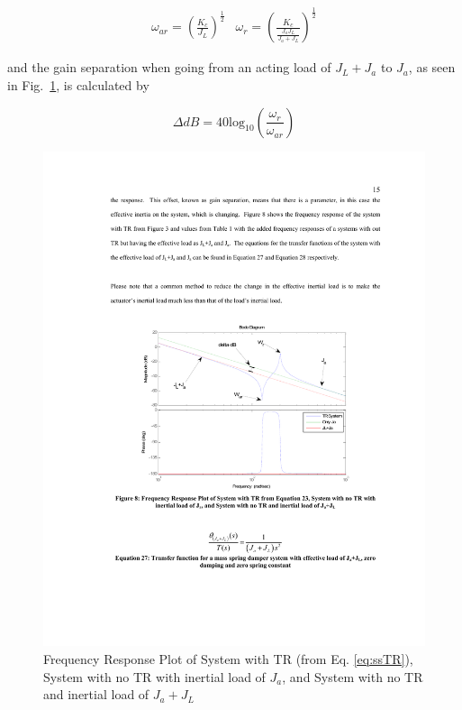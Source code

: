 \begin{equation}
\begin{array}{cc}

\omega_{ar} = \left(\frac{K_c}{J_L}\right)^\frac{1}{2}

&

\omega_{r} = \left(\frac{K_c}{\frac{J_aJ_L}{J_a+J_L}}\right)^\frac{1}{2}
\end{array}
\end{equation}

\noindent and the gain separation when going from an acting load of $J_L+J_a$ to $J_a$, as seen in Fig.~\ref{fig:trBode}, is calculated by

\begin{equation}\label{eq:deltaDB}
\Delta dB = 40\mbox{log}_{10}\left(\frac{\omega_r}{\omega_{ar}}\right)
\end{equation}


\begin{figure}[ht]
  \centering
\includegraphics[width=1.0\columnwidth]{./pix/bode.pdf}
  \caption{Frequency Response Plot of System with TR (from Eq. \ref{eq:ssTR}), System with no TR with
inertial load of $J_a$, and System with no TR and inertial load of $J_a+J_L$}
  \label{fig:trBode}
\end{figure}

